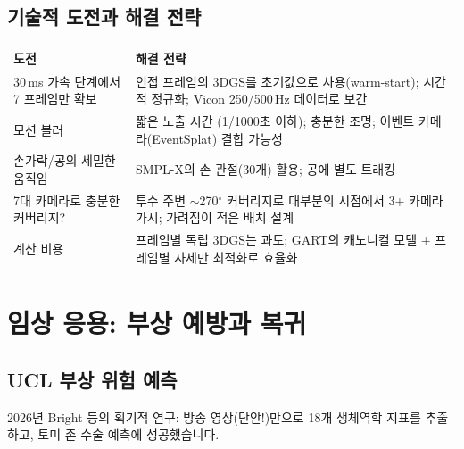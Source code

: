 \documentclass[11pt, a4paper]{report}
\begin{document}
\section{기술적 도전과 해결 전략}
\label{sec:challenges}

\begin{center}
\renewcommand{\arraystretch}{1.4}
\begin{tabular}{p{4cm}p{8cm}}
\toprule
\textbf{도전} & \textbf{해결 전략} \\
\midrule
30\,ms 가속 단계에서 7 프레임만 확보 & 인접 프레임의 3DGS를 초기값으로 사용(warm-start); 시간적 정규화; Vicon 250/500\,Hz 데이터로 보간 \\
\addlinespace
모션 블러 & 짧은 노출 시간 (1/1000초 이하); 충분한 조명; 이벤트 카메라(EventSplat) 결합 가능성 \\
\addlinespace
손가락/공의 세밀한 움직임 & SMPL-X의 손 관절(30개) 활용; 공에 별도 트래킹 \\
\addlinespace
7대 카메라로 충분한 커버리지? & 투수 주변 $\sim$270$^\circ$ 커버리지로 대부분의 시점에서 3+ 카메라 가시; 가려짐이 적은 배치 설계 \\
\addlinespace
계산 비용 & 프레임별 독립 3DGS는 과도; GART의 캐노니컬 모델 + 프레임별 자세만 최적화로 효율화 \\
\bottomrule
\end{tabular}
\end{center}


\chapter{임상 응용: 부상 예방과 복귀}
\label{ch:clinical}

\section{UCL 부상 위험 예측}
\label{sec:ucl_prediction}

2026년 Bright 등의 획기적 연구: 방송 영상(단안!)만으로 18개 생체역학 지표를 추출하고, 토미 존 수술 예측에 성공했습니다.
\end{document}
